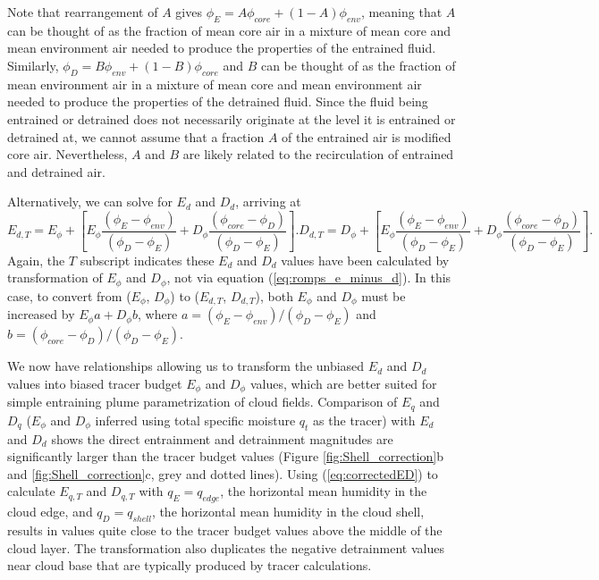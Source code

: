 \documentclass[12pt]{article}
\begin{document}
Note that rearrangement of $A$ gives 
$\phi_E = A \phi_{core} + (1-A)\phi_{env}$, meaning that $A$ can be 
thought of as the fraction of mean core air in a mixture of mean 
core and mean environment air needed to produce the properties of the 
entrained fluid.  Similarly, $\phi_D = B \phi_{env} + (1-B)\phi_{core}$ 
and $B$ can be thought of as the fraction of mean environment air in a 
mixture of mean core and mean environment air needed to produce the 
properties of the detrained fluid.  Since the fluid being entrained or 
detrained does not necessarily originate at the level it is entrained 
or detrained at, we cannot assume that a fraction $A$ of the entrained 
air is modified core air.  Nevertheless, $A$ and $B$ are likely related 
to the recirculation of entrained and detrained air.

Alternatively, we can solve for $E_d$ and $D_d$, arriving at
\begin{subequations}
\begin{equation}
  \label{eq:corrected_entrainment2}
    E_{d,T} = E_{\phi}
        + \left[E_{\phi}\frac{(\phi_E - \phi_{env})}
                               {(\phi_D - \phi_E)} 
              + D_{\phi}\frac{(\phi_{core} - \phi_D)}
                               {(\phi_D - \phi_E)}\right].
\end{equation}
\begin{equation}
  \label{eq:corrected_detrainment2}
    D_{d,T} = D_{\phi} 
        + \left[E_{\phi}\frac{(\phi_E - \phi_{env})}
                               {(\phi_D - \phi_E)}
              + D_{\phi}\frac{(\phi_{core} - \phi_D)}
                               {(\phi_D - \phi_E)}\right].
\end{equation}
\end{subequations}
Again, the $T$ subscript indicates these $E_d$ and $D_d$ values have 
been calculated by transformation of $E_{\phi}$ and $D_{\phi}$, not 
via equation (\ref{eq:romps_e_minus_d}).  In this case, to convert from 
($E_{\phi}$, $D_{\phi}$) to ($E_{d,T}$, $D_{d,T}$), both $E_{\phi}$ and 
$D_{\phi}$ must be increased by $E_{\phi} a + D_{\phi} b$, where 
$a = (\phi_E - \phi_{env})/(\phi_D - \phi_E)$ and 
$b = (\phi_{core} -\phi_D)/(\phi_D - \phi_E)$.

We now have relationships allowing us to transform the unbiased
$E_d$ and $D_d$ values into biased tracer budget
$E_{\phi}$ and $D_{\phi}$ values, which are better suited for
simple entraining plume parametrization of cloud fields.
Comparison of $E_q$ and $D_q$ ($E_{\phi}$ and $D_{\phi}$ inferred
using total specific moisture $q_t$ as the tracer) with $E_d$ and $D_d$
shows the direct entrainment and detrainment magnitudes are significantly larger 
than the tracer budget values (Figure \ref{fig:Shell_correction}b 
and \ref{fig:Shell_correction}c, grey and dotted lines).  
Using (\ref{eq:correctedED}) to calculate $E_{q,T}$ and $D_{q,T}$ with
$q_E = q_{edge}$, the horizontal mean humidity in the cloud edge, and 
$q_D = q_{shell}$, the horizontal mean humidity in the cloud shell, 
results in values quite close to the tracer budget values above the 
middle of the cloud layer. The transformation also duplicates the 
negative detrainment values near cloud base that are typically produced 
by tracer calculations.
\end{document}
